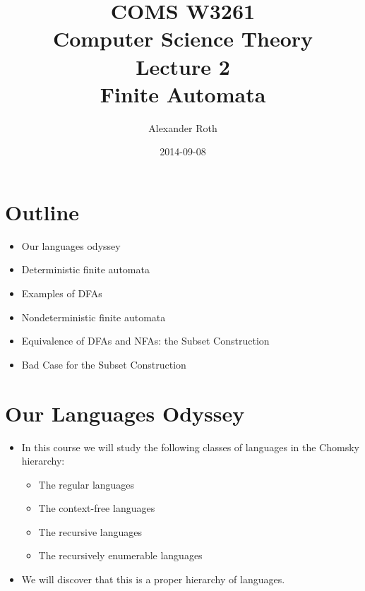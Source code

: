 \documentclass[]{article}
\begin{document}
\title{COMS W3261 \\ Computer Science Theory \\ Lecture 2\\ Finite Automata}
\author{Alexander Roth}
\date{2014-09-08}
\maketitle

\section*{Outline}
  \begin{itemize}
    \item Our languages odyssey
    \item Deterministic finite automata
    \item Examples of DFAs
    \item Nondeterministic finite automata
    \item Equivalence of DFAs and NFAs: the Subset Construction
    \item Bad Case for the Subset Construction
  \end{itemize}

\section{Our Languages Odyssey}
  \begin{itemize}
    \item In this course we will study the following classes of languages in the
    Chomsky hierarchy:
      \begin{itemize}
        \item The regular languages
        \item The context-free languages
        \item The recursive languages
        \item The recursively enumerable languages
      \end{itemize}
    \item We will discover that this is a proper hierarchy of languages.
  \end{itemize}
\end{document}
